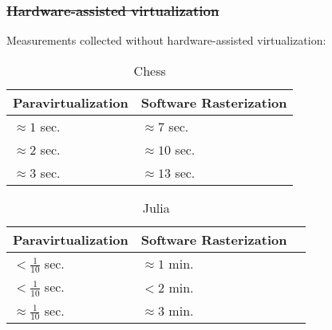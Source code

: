 \begin{frame}
\frametitle{\sout{Hardware-assisted virtualization}}

\begin{center}
Measurements collected without hardware-assisted virtualization:
\end{center}

\begin{table}[]
\centering
\caption{Chess}
\begin{tabular}{ll}
\hline
Paravirtualization & Software Rasterization \\ \hline
$\approx 1$ sec. & $\approx 7$ sec. \\
$\approx 2$ sec. & $\approx 10$ sec. \\
$\approx 3$ sec. & $\approx 13$ sec. \\ \hline
\end{tabular}
\end{table}

\begin{table}[]
\centering
\caption{Julia}
\begin{tabular}{lll}
\hline
Paravirtualization & Software Rasterization \\ \hline
$<\frac{1}{10}$ sec. & $\approx 1$ min. \\
$<\frac{1}{10}$ sec. & $<2$ min. \\
$\approx \frac{1}{10}$ sec. & $\approx 3$ min. \\ \hline
\end{tabular}
\end{table}


\end{frame}
